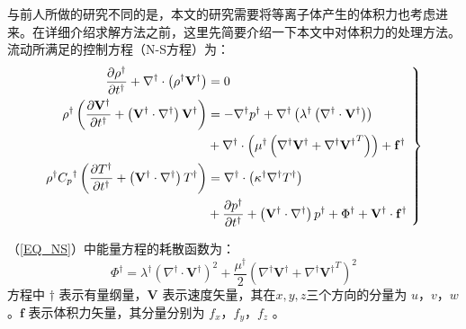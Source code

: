 与前人所做的研究不同的是，本文的研究需要将等离子体产生的体积力也考虑进来。在详细介绍求解方法之前，这里先简要介绍一下本文中对体积力的处理方法。流动所满足的控制方程（N-S方程）为：
\begin{equation}\label{EQ_NS}\left.
\begin{aligned}
    \frac{\partial{\rho^\dagger}}{\partial{t^\dagger}}
    + {\nabla^\dagger}\cdot\left({\rho^\dagger}{\mathbf{V}^\dagger}\right) & =0
    \\
    {\rho^\dagger}\left( {\frac{\partial{\mathbf{V}^\dagger}}{\partial{t^\dagger}}
    + \left( {{\mathbf{V}^\dagger}\cdot{\nabla^\dagger}}\right)
    {\mathbf{V}^\dagger}} \right) & =
     - {\nabla^\dagger}{p^\dagger} + {\nabla^\dagger}\left( {{\lambda ^\dagger}\left( {{\nabla ^\dagger} \cdot {\mathbf{V}^\dagger}} \right)} \right) \\
    & + {\nabla ^\dagger} \cdot \left( {{\mu ^\dagger}\left( {{\nabla ^\dagger}{\mathbf{V}^\dagger} + {\nabla ^\dagger}{\mathbf{V}^\dagger}^T} \right)} \right) + \mathbf{f}^\dagger
    \\
    {\rho ^\dagger}{C_p}^\dagger\left( {\frac{{\partial{T^\dagger}}}{{\partial{t^\dagger}}} + \left( {{{\mathbf{V}}^\dagger} \cdot {\nabla ^\dagger}} \right){T^\dagger}} \right) & =
    {\nabla ^\dagger} \cdot \left( {{\kappa ^\dagger}{\nabla ^\dagger}{T^\dagger}} \right) \\
    & + \frac{{\partial{p^\dagger}}}{{\partial{t^\dagger}}} + \left( {{{\mathbf{V}}^\dagger} \cdot {\nabla ^\dagger}} \right){p^\dagger} + {\Phi ^\dagger} + \mathbf{V}^\dagger \cdot \mathbf{f}^\dagger
\end{aligned}~\right\}
\end{equation}

（\ref{EQ_NS}）中能量方程的耗散函数为：
\begin{equation}
    {\Phi ^\dagger} = {\lambda ^\dagger}{{\left( {{\nabla ^\dagger} \cdot {{{\mathbf{V}}}^\dagger}} \right)}^2} + \frac{{{\mu ^\dagger}}}{2}{{\left( {{\nabla ^\dagger}{{{\mathbf{V}}}^\dagger} + {\nabla ^\dagger}{{{\mathbf{V}}}^\dagger}^T} \right)}^2}
\end{equation}
方程中 $\dagger$ 表示有量纲量，${\mathbf{V}}$ 表示速度矢量，其在$x,y,z$三个方向的分量为 $u$，$v$，$w$ 。${\mathbf{f}}$ 表示体积力矢量，其分量分别为 $f_x$，$f_y$，$f_z$ 。

